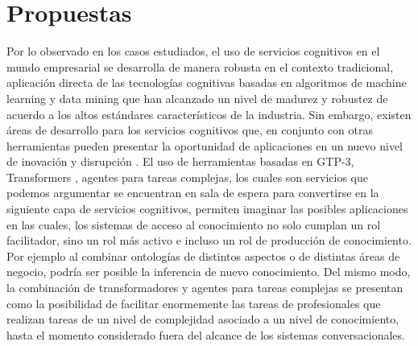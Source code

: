 \section{Propuestas}
Por lo observado en los casos estudiados, el uso de servicios cognitivos en el mundo empresarial se desarrolla de manera robusta en el contexto tradicional, aplicación directa de las tecnologías cognitivas basadas en algoritmos de machine learning y data mining que han alcanzado un nivel de madurez y robustez de acuerdo a los altos estándares característicos de la industria. Sin embargo, existen áreas de desarrollo para los servicios cognitivos que, en conjunto con otras herramientas pueden presentar la oportunidad de aplicaciones en un nuevo nivel de inovación y disrupción \cite{Majarres}.
El uso de herramientas basadas en GTP-3, Transformers \cite{Vaswani2017}, agentes para tareas complejas, los cuales son servicios que podemos argumentar se encuentran en sala de espera para convertirse en la siguiente capa de servicios cognitivos, permiten imaginar las posibles aplicaciones en las cuales, los sistemas de acceso al conocimiento no solo cumplan un rol facilitador, sino un rol más activo e incluso un rol de producción de conocimiento. Por ejemplo al combinar ontologías de distintos aspectos o de distintas áreas de negocio, podría ser posible la inferencia de nuevo conocimiento. Del mismo modo, la combinación de transformadores y agentes para tareas complejas se presentan como la posibilidad de facilitar enormemente las tareas de profesionales que realizan tareas de un nivel de complejidad asociado a un nivel de conocimiento, hasta el momento considerado fuera del alcance de los sistemas conversacionales.